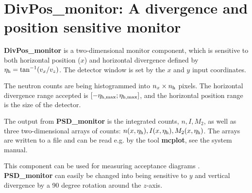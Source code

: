 \section{DivPos\_monitor: A divergence and position sensitive monitor}
\label{s:divpos-monitor}

{\bf DivPos\_monitor} is a two-dimensional monitor component,
which is sensitive to both horizontal position ($x$) and horizontal divergence
defined by $\eta_{\rm h} = \tan^{-1}(v_x/v_z)$.
The detector window is set
by the $x$ and $y$ input coordinates.

The neutron counts are being histogrammed
into $n_x \times n_{\rm h}$ pixels. The horizontal divergence range accepted is
$[-\eta_{\rm h,max}; \eta_{\rm h,max}]$, and the horizontal position
range is the size of the detector.

The output from {\bf PSD\_monitor} is the integrated counts, $n, I, M_2$,
as well as
three two-dimensional arrays of counts: $n(x,\eta_{\rm h}),
I(x,\eta_{\rm h}), M_2(x,\eta_{\rm h})$.
The arrays are written to a file and can be read e.g. by the tool
{\bf mcplot}, see the system manual.

This component can be used for measuring acceptance diagrams \cite{Cussen03}.
{\bf PSD\_monitor} can easily be changed into being sensitive
to $y$ and vertical divergence by a 90 degree rotation around the $z$-axis.
